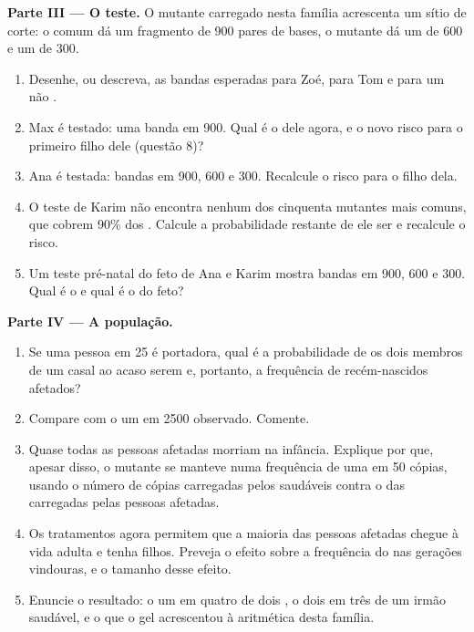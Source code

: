 \begin{problem}
\medskip
\noindent\textbf{Parte III --- O teste.}
O  mutante carregado nesta família acrescenta um sítio de corte: o
 comum dá um fragmento de 900 pares de bases, o mutante dá um de
600 e um de 300.
\begin{enumerate}[resume]
  \item Desenhe, ou descreva, as bandas esperadas para Zoé, para Tom e
        para um não .
  \item Max é testado: uma banda em 900. Qual é o  dele agora,
        e o novo risco para o primeiro filho dele (questão 8)?
  \item Ana é testada: bandas em 900, 600 e 300. Recalcule o risco para
        o filho dela.
  \item O teste de Karim não encontra nenhum dos cinquenta 
        mutantes mais comuns, que cobrem 90\% dos . Calcule a
        probabilidade restante de ele ser  e recalcule o risco.
  \item Um teste pré-natal do feto de Ana e Karim mostra bandas em 900,
        600 e 300. Qual é o  e qual é o  do feto?
\end{enumerate}

\medskip
\noindent\textbf{Parte IV --- A população.}
\begin{enumerate}[resume]
  \item Se uma pessoa em 25 é portadora, qual é a probabilidade de os
        dois membros de um casal ao acaso serem  e, portanto,
        a frequência de recém-nascidos afetados?
  \item Compare com o um em 2500 observado. Comente.
  \item Quase todas as pessoas afetadas morriam na infância. Explique
        por que, apesar disso, o  mutante se manteve numa
        frequência de uma em 50 cópias, usando o número de cópias
        carregadas pelos  saudáveis contra o das carregadas
        pelas pessoas afetadas.
  \item Os tratamentos agora permitem que a maioria das pessoas
        afetadas chegue à vida adulta e tenha filhos. Preveja o efeito
        sobre a frequência do  nas gerações vindouras, e o tamanho
        desse efeito.
  \item Enuncie o resultado: o um em quatro de dois , o dois
        em três de um irmão saudável, e o que o gel acrescentou à
        aritmética desta família.
\end{enumerate}
\end{problem}
